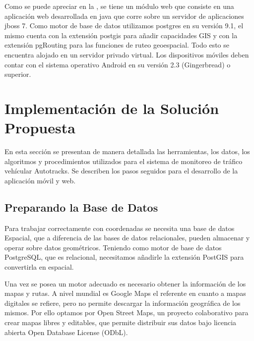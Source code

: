 Como se puede apreciar en la , se tiene un módulo web que consiste en una aplicación web desarrollada en java que corre sobre un servidor de aplicaciones jboss 7. Como motor de base de datos utilizamos postgres en su versión 9.1, el mismo cuenta con la extensión postgis para añadir capacidades GIS y con la extensión pgRouting para las funciones de ruteo geoespacial. Todo esto se encuentra alojado en un servidor privado virtual. Los dispositivos móviles deben contar con el sistema operativo Android en su versión 2.3 (Gingerbread) o superior.

\section{Implementación de la Solución Propuesta}

En esta sección se presentan de manera detallada las herramientas, los datos, los algoritmos y procedimientos utilizados para el sistema de monitoreo de tráfico vehícular Autotracks. Se describen los pasos seguidos para el desarrollo de la aplicación móvil y web.

\subsection{Preparando la Base de Datos}
\label{base-de-datos}

Para trabajar correctamente con coordenadas se necesita una base de datos Espacial, que a diferencia de las bases de datos relacionales, pueden almacenar y operar sobre datos geométricos. Teniendo como motor de base de datos PostgreSQL, que es relacional, necesitamos añadirle la extensión PostGIS para convertirla en espacial.

Una vez se posea un motor adecuado es necesario obtener la información de los mapas y rutas. A nivel mundial es Google Maps el referente en cuanto a mapas digitales se refiere, pero no permite descargar la información geográfica de los mismos. Por ello optamos por Open Street Maps, un proyecto colaborativo para crear mapas libres y editables, que permite distribuir sus datos bajo licencia abierta Open Database License (ODbL).

